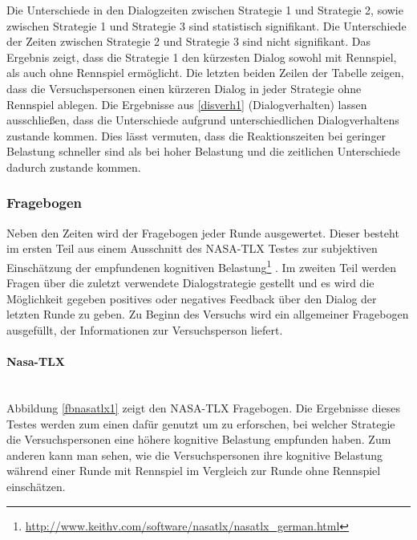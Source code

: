 \documentclass[12pt,a4paper]{scrartcl}
\begin{document}
Die Unterschiede in den Dialogzeiten zwischen Strategie 1 und Strategie 2, sowie zwischen Strategie 1 und Strategie 3 sind statistisch signifikant. Die Unterschiede der Zeiten zwischen Strategie 2 und Strategie 3 sind nicht signifikant. Das Ergebnis zeigt, dass die Strategie 1 den kürzesten Dialog sowohl mit Rennspiel, als auch ohne Rennspiel ermöglicht. Die letzten beiden Zeilen der Tabelle zeigen, dass die Versuchspersonen einen kürzeren Dialog in jeder Strategie ohne Rennspiel ablegen. Die Ergebnisse aus \ref{disverh1} (Dialogverhalten) lassen ausschließen, dass die Unterschiede aufgrund unterschiedlichen Dialogverhaltens zustande kommen. Dies lässt vermuten, dass die Reaktionszeiten bei geringer Belastung schneller sind als bei hoher Belastung und die zeitlichen Unterschiede dadurch zustande kommen. 
\subsubsection{Fragebogen}
\label{fragebogen1}
Neben den Zeiten wird der Fragebogen jeder Runde ausgewertet. Dieser besteht im ersten Teil aus einem Ausschnitt des NASA-TLX Testes zur subjektiven Einschätzung der empfundenen kognitiven Belastung\footnote{\label{foot:nasatlx1}\url{http://www.keithv.com/software/nasatlx/nasatlx_german.html}} . Im zweiten Teil werden Fragen über die zuletzt verwendete Dialogstrategie gestellt und es wird die Möglichkeit gegeben positives oder negatives Feedback über den Dialog der letzten Runde zu geben. Zu Beginn des Versuchs wird ein allgemeiner Fragebogen ausgefüllt, der Informationen zur Versuchsperson liefert. 
\paragraph{Nasa-TLX}
~\\
Abbildung \ref{fbnasatlx1} zeigt den NASA-TLX Fragebogen. 
Die Ergebnisse dieses Testes werden zum einen dafür genutzt um zu erforschen, bei welcher Strategie die Versuchspersonen eine höhere kognitive Belastung empfunden haben. Zum anderen kann man sehen, wie die Versuchspersonen ihre kognitive Belastung während einer Runde mit Rennspiel im Vergleich zur Runde ohne Rennspiel einschätzen. 
\end{document}
